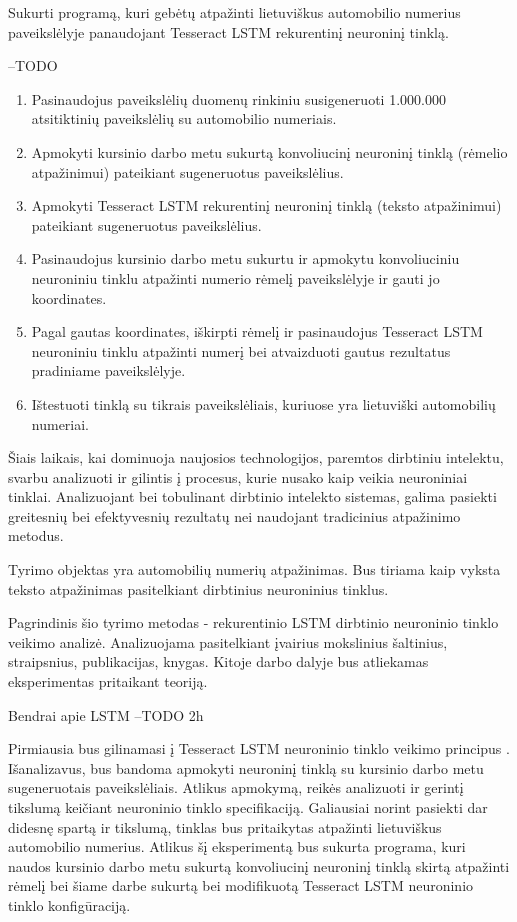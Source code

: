 \documentclass{VUMIFInfBakalaurinis}
\begin{document}
Sukurti programą, kuri gebėtų atpažinti lietuviškus automobilio numerius paveikslėlyje panaudojant Tesseract LSTM rekurentinį neuroninį tinklą.

--TODO
\begin{enumerate}
  \item Pasinaudojus paveikslėlių duomenų rinkiniu susigeneruoti 1.000.000 atsitiktinių paveikslėlių su automobilio numeriais.
  \item Apmokyti kursinio darbo metu sukurtą konvoliucinį neuroninį tinklą (rėmelio atpažinimui) pateikiant sugeneruotus paveikslėlius.
  \item Apmokyti Tesseract LSTM rekurentinį neuroninį tinklą (teksto atpažinimui) pateikiant sugeneruotus paveikslėlius.
  \item Pasinaudojus kursinio darbo metu sukurtu ir apmokytu konvoliuciniu neuroniniu tinklu atpažinti numerio rėmelį paveikslėlyje ir gauti jo koordinates.
  \item Pagal gautas koordinates, iškirpti rėmelį ir pasinaudojus Tesseract LSTM neuroniniu tinklu atpažinti numerį bei atvaizduoti gautus rezultatus pradiniame paveikslėlyje.
  \item Ištestuoti tinklą su tikrais paveikslėliais, kuriuose yra lietuviški automobilių numeriai.
\end{enumerate}

Šiais laikais, kai dominuoja naujosios technologijos, paremtos dirbtiniu intelektu, svarbu
analizuoti ir gilintis į procesus, kurie nusako kaip veikia neuroniniai tinklai. Analizuojant bei 
tobulinant dirbtinio intelekto sistemas, galima pasiekti greitesnių bei efektyvesnių rezultatų nei
naudojant tradicinius atpažinimo metodus.

Tyrimo objektas yra automobilių numerių atpažinimas. Bus tiriama kaip vyksta teksto atpažinimas pasitelkiant dirbtinius neuroninius tinklus.

Pagrindinis šio tyrimo metodas - rekurentinio LSTM dirbtinio neuroninio tinklo veikimo
analizė. Analizuojama pasitelkiant įvairius mokslinius šaltinius, straipsnius, publikacijas, knygas.
Kitoje darbo dalyje bus atliekamas eksperimentas pritaikant teoriją.

Bendrai apie LSTM
--TODO 2h


Pirmiausia bus gilinamasi į Tesseract LSTM neuroninio tinklo veikimo principus \cite{bhushan2013license}.
Išanalizavus, bus bandoma apmokyti neuroninį tinklą su kursinio darbo metu sugeneruotais 
paveikslėliais. Atlikus apmokymą, reikės analizuoti ir gerintį tikslumą keičiant neuroninio tinklo
specifikaciją. Galiausiai norint pasiekti dar didesnę spartą ir tikslumą, tinklas bus pritaikytas 
atpažinti lietuviškus automobilio numerius. Atlikus šį eksperimentą bus sukurta programa, kuri
naudos kursinio darbo metu sukurtą konvoliucinį neuroninį tinklą skirtą atpažinti rėmelį bei šiame
darbe sukurtą bei modifikuotą Tesseract LSTM neuroninio tinklo konfigūraciją.
\end{document}
